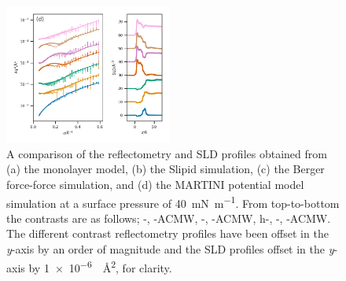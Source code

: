 \documentclass[amsmath,amssymb,superscriptaddress]{revtex4-1}
\begin{document}
\begin{figure}
 \includegraphics[width=0.49\textwidth]{sim_martini_40}
 \caption{A comparison of the reflectometry and SLD profiles obtained from (a) the monolayer model, (b) the Slipid simulation, (c) the Berger force-force simulation, and (d) the MARTINI potential model simulation at a surface pressure of \SI{40}{\milli\newton\per\meter}. From top-to-bottom the contrasts are as follows; -, -ACMW, -, -ACMW, h-, -, -ACMW. The different contrast reflectometry profiles have been offset in the \emph{y}-axis by an order of magnitude and the SLD profiles offset in the \emph{y}-axis by \SI{1e-6}{\per\square\angstrom}, for clarity.}
 \label{fig:sp40}
\end{figure}
%
%
\end{document}
